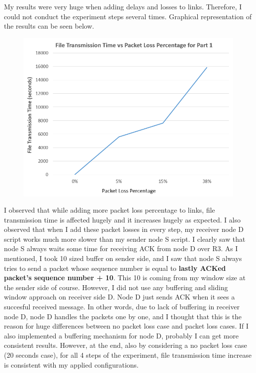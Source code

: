 \documentclass[12pt]{article}
\begin{document}
My results were very huge when adding delays and losses to links. Therefore, I could not conduct the experiment steps several times. Graphical representation of the results can be seen below.

\newpage

\begin{figure}[h!]
  \includegraphics[width=\linewidth]{graphExp.png}
\end{figure} 


I observed that while adding more packet loss percentage to links, file transmission time is affected hugely and it increases hugely as expected. I also observed that when I add these packet losses in every step, my receiver node D script works much more slower than my sender node S script. I clearly saw that node S always waits some time for receiving ACK from node D over R3. As I mentioned, I took 10 sized buffer on sender side, and I saw that node S always tries to send a packet whose sequence number is equal to \textbf{lastly ACKed packet's sequence number + 10}. This 10 is coming from my window size at the sender side of course. However, I did not use any buffering and sliding window approach on receiver side D. Node D just sends ACK when it sees a succesful received message. In other words, due to lack of buffering in receiver node D, node D handles the packets one by one, and I thought that this is the reason for huge differences between no packet loss case and packet loss cases. If I also implemented a buffering mechanism for node D, probably I can get more consistent results. However, at the end, also by considering a no packet loss case (20 seconds case), for all 4 steps of the experiment, file transmission time increase is consistent with my applied configurations.


  
\end{document}
